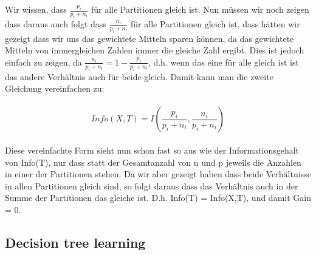 \documentclass{article}
\begin{document}
Wir wissen, dass $\frac{p_i}{p_i+n_i}$ für alle Partitionen gleich ist. Nun müssen wir noch zeigen dass daraus auch folgt dass $\frac{n_i}{p_i+n_i}$ für alle Partitionen gleich ist, dass hätten wir gezeigt dass wir uns das gewichtete Mitteln sparen können, da das gewichtete Mitteln von immergleichen Zahlen immer die gleiche Zahl ergibt. Dies ist jedoch einfach zu zeigen, da $\frac{n_i}{p_i+n_i} = 1 - \frac{p_i}{p_i+n_i}$, d.h. wenn das eine für alle gleich ist ist das andere Verhältnis auch für beide gleich. Damit kann man die zweite Gleichung vereinfachen zu: 
\paragraph{}
\[
	Info(X,T) = I(\frac{p_i}{p_i+n_i},\frac{n_i}{p_i+n_i})
\]
\paragraph{}
Diese vereinfachte Form sieht nun schon fast so aus wie der Informationsgehalt von Info(T), nur dass statt der Gesamtanzahl von n und p jeweils die Anzahlen in einer der Partitionen stehen. Da wir aber gezeigt haben dass beide Verhältnisse in allen Partitionen gleich sind, so folgt daraus dass das Verhältnis auch in der Summe der Partitionen das gleiche ist. D.h. Info(T) = Info(X,T), und damit Gain = 0.

\subsection{Decision tree learning}
\end{document}
